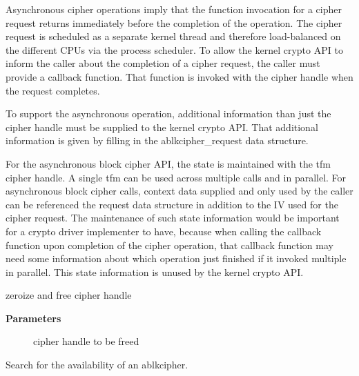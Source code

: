 \documentclass[a4paper,8pt,english]{sphinxmanual}
\begin{document}
Asynchronous cipher operations imply that the function invocation for a
cipher request returns immediately before the completion of the operation.
The cipher request is scheduled as a separate kernel thread and therefore
load-balanced on the different CPUs via the process scheduler. To allow
the kernel crypto API to inform the caller about the completion of a cipher
request, the caller must provide a callback function. That function is
invoked with the cipher handle when the request completes.

To support the asynchronous operation, additional information than just the
cipher handle must be supplied to the kernel crypto API. That additional
information is given by filling in the ablkcipher\_request data structure.

For the asynchronous block cipher API, the state is maintained with the tfm
cipher handle. A single tfm can be used across multiple calls and in
parallel. For asynchronous block cipher calls, context data supplied and
only used by the caller can be referenced the request data structure in
addition to the IV used for the cipher request. The maintenance of such
state information would be important for a crypto driver implementer to
have, because when calling the callback function upon completion of the
cipher operation, that callback function may need some information about
which operation just finished if it invoked multiple in parallel. This
state information is unused by the kernel crypto API.

\begin{fulllineitems}
\label{crypto/api-skcipher:c.crypto_free_ablkcipher}
zeroize and free cipher handle

\end{fulllineitems}


\textbf{Parameters}
\begin{description}
\item[{}] \leavevmode
cipher handle to be freed

\end{description}

\begin{fulllineitems}
\label{crypto/api-skcipher:c.crypto_has_ablkcipher}
Search for the availability of an ablkcipher.

\end{fulllineitems}
\end{document}

